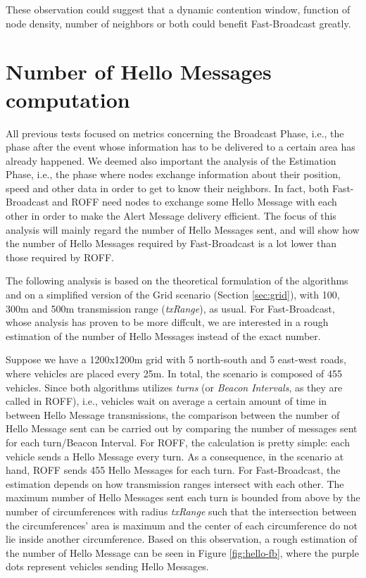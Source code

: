 		
		These observation could suggest that a dynamic contention window, function of node density, number of neighbors or both could benefit Fast-Broadcast greatly.
		
	\section{Number of Hello Messages computation}
		All previous tests focused on metrics concerning the Broadcast Phase, i.e., the phase after the event whose information has to be delivered to a certain area has already happened. We deemed also important the analysis of the Estimation Phase, i.e., the phase where nodes exchange information about their position, speed and other data in order to get to know their neighbors. In fact, both Fast-Broadcast and ROFF need nodes to exchange some Hello Message with each other in order to make the Alert Message delivery efficient. The focus of this analysis will mainly regard the number of Hello Messages sent, and will show how the number of Hello Messages required by Fast-Broadcast is a lot lower than those required by ROFF. 
		
		The following analysis is based on the theoretical formulation of the algorithms and on a simplified version of the Grid scenario (Section \ref{sec:grid}), with 100, 300m and 500m transmission range (\textit{txRange}), as usual.  For Fast-Broadcast, whose analysis has proven to be more diffcult, we are interested in a rough estimation of the number of Hello Messages instead of the exact number. 
		
		Suppose we have a 1200x1200m grid with 5 north-south and 5 east-west roads, where vehicles are placed every 25m. In total, the scenario is composed of 455 vehicles. Since both algorithms utilizes \textit{turns} (or \textit{Beacon Intervals}, as they are called in ROFF), i.e., vehicles wait on average a certain amount of time in between Hello Message transmissions, the comparison between the number of Hello Message sent can be carried out by comparing the number of messages sent for each turn/Beacon Interval. For ROFF, the calculation is pretty simple: each vehicle sends a Hello Message every turn. As a consequence, in the scenario at hand, ROFF sends 455 Hello Messages for each turn. For Fast-Broadcast, the estimation depends on how transmission ranges intersect with each other. The maximum number of Hello Messages sent each turn is bounded from above by the number of circumferences with radius \textit{txRange} such that the intersection between the circumferences' area is maximum and the center of each circumference do not lie inside another circumference. Based on this observation, a rough estimation of the number of Hello Message can be seen in Figure \ref{fig:hello-fb}, where the purple dots represent vehicles sending Hello Messages.
		
